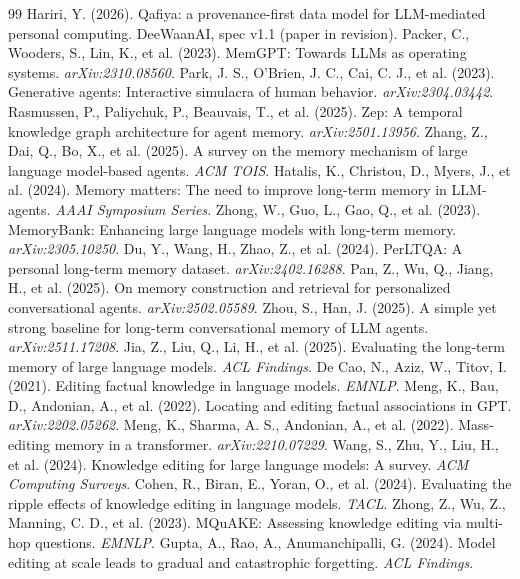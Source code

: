 \documentclass[11pt]{article}
\begin{document}
\begin{thebibliography}{99}\small
{} Hariri, Y. (2026). Qafiya: a provenance-first data model for LLM-mediated personal computing. DeeWaanAI, spec v1.1 (paper in revision).
 Packer, C., Wooders, S., Lin, K., et al. (2023). MemGPT: Towards LLMs as operating systems. \emph{arXiv:2310.08560}.
 Park, J. S., O'Brien, J. C., Cai, C. J., et al. (2023). Generative agents: Interactive simulacra of human behavior. \emph{arXiv:2304.03442}.
 Rasmussen, P., Paliychuk, P., Beauvais, T., et al. (2025). Zep: A temporal knowledge graph architecture for agent memory. \emph{arXiv:2501.13956}.
 Zhang, Z., Dai, Q., Bo, X., et al. (2025). A survey on the memory mechanism of large language model-based agents. \emph{ACM TOIS}.
 Hatalis, K., Christou, D., Myers, J., et al. (2024). Memory matters: The need to improve long-term memory in LLM-agents. \emph{AAAI Symposium Series}.
 Zhong, W., Guo, L., Gao, Q., et al. (2023). MemoryBank: Enhancing large language models with long-term memory. \emph{arXiv:2305.10250}.
 Du, Y., Wang, H., Zhao, Z., et al. (2024). PerLTQA: A personal long-term memory dataset. \emph{arXiv:2402.16288}.
 Pan, Z., Wu, Q., Jiang, H., et al. (2025). On memory construction and retrieval for personalized conversational agents. \emph{arXiv:2502.05589}.
 Zhou, S., Han, J. (2025). A simple yet strong baseline for long-term conversational memory of LLM agents. \emph{arXiv:2511.17208}.
 Jia, Z., Liu, Q., Li, H., et al. (2025). Evaluating the long-term memory of large language models. \emph{ACL Findings}.
 De Cao, N., Aziz, W., Titov, I. (2021). Editing factual knowledge in language models. \emph{EMNLP}.
 Meng, K., Bau, D., Andonian, A., et al. (2022). Locating and editing factual associations in GPT. \emph{arXiv:2202.05262}.
 Meng, K., Sharma, A. S., Andonian, A., et al. (2022). Mass-editing memory in a transformer. \emph{arXiv:2210.07229}.
 Wang, S., Zhu, Y., Liu, H., et al. (2024). Knowledge editing for large language models: A survey. \emph{ACM Computing Surveys}.
 Cohen, R., Biran, E., Yoran, O., et al. (2024). Evaluating the ripple effects of knowledge editing in language models. \emph{TACL}.
 Zhong, Z., Wu, Z., Manning, C. D., et al. (2023). MQuAKE: Assessing knowledge editing via multi-hop questions. \emph{EMNLP}.
 Gupta, A., Rao, A., Anumanchipalli, G. (2024). Model editing at scale leads to gradual and catastrophic forgetting. \emph{ACL Findings}.

\end{thebibliography}
\end{document}
